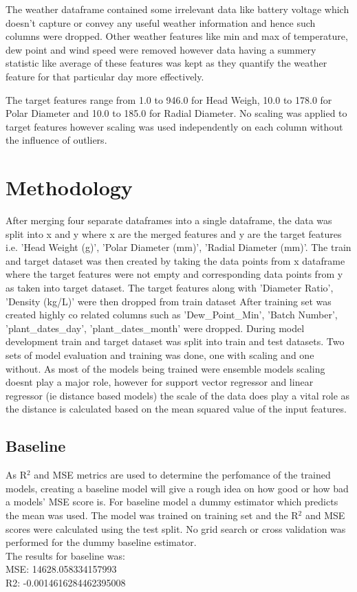 \documentclass{article}
\begin{document}
  

The weather dataframe contained some irrelevant data like battery voltage which doesn’t capture or convey any useful weather information and hence such columns were dropped. Other weather features like min and max of temperature, dew point and wind speed were removed however data having a summery statistic like average of these features was kept as they quantify the weather feature for that particular day more effectively. 

 

The target features range from 1.0 to 946.0 for Head Weigh, 10.0 to 178.0 for Polar Diameter and 10.0 to 185.0 for Radial Diameter. No scaling was applied to target features however scaling was used independently on each column without the influence of outliers. 




\section{Methodology}
After merging four separate dataframes into a single dataframe, the data was split into x and y where x are the merged features and y are the target features i.e. 'Head Weight (g)', 'Polar Diameter (mm)', 'Radial Diameter (mm)'. The train and target dataset was then created by taking the data points from x dataframe where the target features were not empty and corresponding data points from y as taken into target dataset. The target features along with 'Diameter Ratio', 'Density (kg/L)' were then dropped from train dataset 
After training set was created highly co related columns such as 'Dew\_Point\_Min', 'Batch Number', 'plant\_dates\_day', 'plant\_dates\_month' were dropped.
During model development train and target dataset was split into train and test datasets. 
Two sets of model evaluation and training was done, one with scaling and one without. As most of the models being trained were ensemble models scaling doesnt play a major role, however for support vector regressor and linear regressor (ie distance based models) the scale of the data does play a vital role as the distance is calculated based on the mean squared value of the input features.


 

\subsection{Baseline}
As R$^2$ and MSE metrics are used to determine the perfomance of the trained models, creating a baseline model will give a rough idea on how good or how bad a models' MSE score is. For baseline model a dummy estimator which predicts the mean was used. The model was trained on training set and the R$^2$ and MSE scores were calculated using the test split. No grid search or cross validation was performed for the dummy baseline estimator.\\
The results for baseline was:\\
MSE: 14628.058334157993 \\
R2: -0.0014616284462395008
\end{document}
